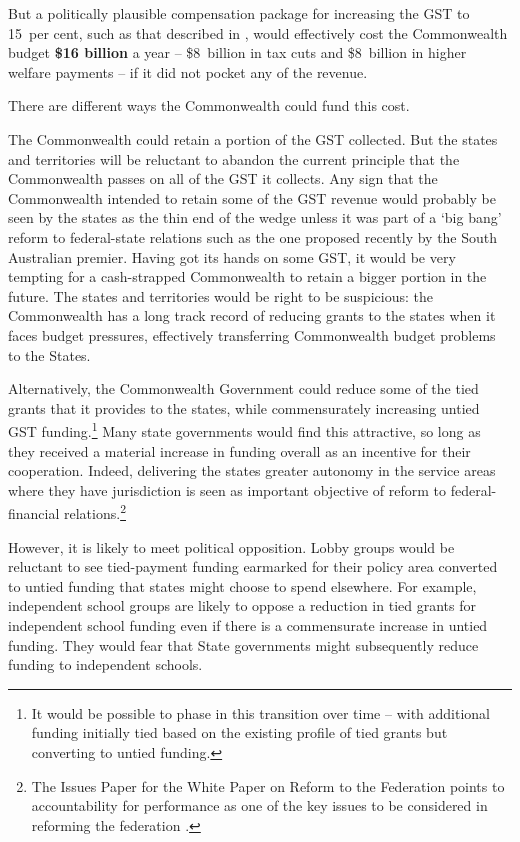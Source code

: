 But a politically plausible compensation package for increasing the GST to 15~per cent, such as that described in , would effectively cost the Commonwealth budget \textbf{\$16 billion} a year – \$8~billion in tax cuts and \$8~billion in higher welfare payments – if it did not pocket any of the revenue. 

There are different ways the Commonwealth could fund this cost. 

The Commonwealth could retain a portion of the GST collected. But the states and territories will be reluctant to abandon the current principle that the Commonwealth passes on all of the GST it collects. Any sign that the Commonwealth intended to retain some of the GST revenue would probably be seen by the states as the thin end of the wedge  unless it was part of a ‘big bang’ reform to federal-state relations such as the one proposed recently by the South Australian premier.  Having got its hands on some GST, it would be very tempting for a cash-strapped Commonwealth to retain a bigger portion in the future. The states and territories would be right to be suspicious: the Commonwealth has a long track record of reducing grants to the states when it faces budget pressures, effectively transferring Commonwealth budget problems to the States.

	

Alternatively, the Commonwealth Government could reduce some of the tied grants that it provides to the states, while commensurately increasing untied GST funding.\footnote{It would be possible to phase in this transition over time – with additional funding initially tied based on the existing profile of tied grants but converting to untied funding.}  Many state governments would find this attractive, so long as they received a material increase in funding overall as an incentive for their cooperation. Indeed, delivering the states greater autonomy in the service areas where they have jurisdiction is seen as important objective of reform to federal-financial relations.\footnote{The Issues Paper for the White Paper on Reform to the Federation points to accountability for performance as one of the key issues to be considered in reforming the federation \textcite[][13--25]{PrimeMinisterCabinet2014a}.}  

However, it is likely to meet political opposition. Lobby groups would be reluctant to see tied-payment funding earmarked for their policy area converted to untied funding that states might choose to spend elsewhere. For example, independent school groups are likely to oppose a reduction in tied grants for independent school funding even if there is a commensurate increase in untied funding. They would fear that State governments might subsequently reduce funding to independent schools.

